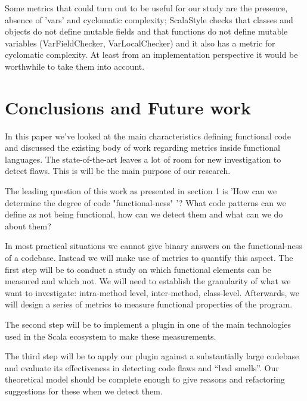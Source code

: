 \documentclass{article}
\begin{document}
Some metrics that could turn out to be useful for our study are  the presence, absence of 'vars' and cyclomatic complexity; ScalaStyle checks that classes and objects do not define mutable fields and that functions do not define mutable variables (VarFieldChecker, VarLocalChecker) \cite{scalastyle} and it also has a metric for cyclomatic complexity. At least from an implementation perspective it would be worthwhile to take them into account.\par


\section{Conclusions and Future work}
In this paper we've looked at the main characteristics defining functional code and discussed the existing body of work regarding metrics inside functional languages. The state-of-the-art leaves a lot of room for new investigation to detect flaws. This is will be the main purpose of our research.

The leading question of this work as presented in  section 1  is  'How can we determine the degree of code "functional-ness" '? What code patterns can we define as not being functional, how can we detect them and what can we do about them? \par

In most practical situations we cannot give binary answers on the functional-ness of a codebase. Instead we will make use of metrics to quantify this aspect. The first step will be to conduct a study on which functional elements can be measured and which not. We will need to establish the granularity of what we want to investigate: intra-method level, inter-method, class-level. Afterwards, we will design a series of metrics to measure functional properties of the program. \par

The second step will be to implement a plugin in one of the main technologies used in the Scala ecosystem to make these measurements.\par

The third step will be to apply our plugin against a substantially large codebase and evaluate its effectiveness in detecting code flaws and ``bad smells''. Our theoretical model should be complete enough to give reasons and refactoring suggestions for these when we detect them.


\newpage

 

\end{document}
